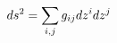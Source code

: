 \documentclass[preview]{standalone}
\begin{document}
\begin{align*}
\special{dvisvgm:raw <g id='unique000'>}ds^2 = \sum_{i,j} g_{ij} dz^i dz^j\special{dvisvgm:raw </g>}
\end{align*}
\end{document}
